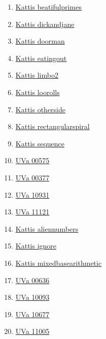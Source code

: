 \begin{enumerate}
\item \href{https://open.kattis.com/problems/beatifulprimes}{Kattis beatifulprimes}
\item \href{https://open.kattis.com/problems/dickandjane}{Kattis dickandjane}
\item \href{https://open.kattis.com/problems/doorman}{Kattis doorman}
\item \href{https://open.kattis.com/problems/eatingout}{Kattis eatingout}
\item \href{https://open.kattis.com/problems/limbo2}{Kattis limbo2}
\item \href{https://open.kattis.com/problems/loorolls}{Kattis loorolls}
\item \href{https://open.kattis.com/problems/otherside}{Kattis otherside}
\item \href{https://open.kattis.com/problems/rectangularspiral}{Kattis rectangularspiral}
\item \href{https://open.kattis.com/problems/sequence}{Kattis sequence}
\item \href{https://onlinejudge.org/index.php?option=com_onlinejudge&Itemid=8&page=show_problem&problem=516}{UVa 00575}
\item \href{https://onlinejudge.org/index.php?option=com_onlinejudge&Itemid=8&page=show_problem&problem=313}{UVa 00377}
\item \href{https://onlinejudge.org/index.php?option=com_onlinejudge&Itemid=8&page=show_problem&problem=1872}{UVa 10931}
\item \href{https://onlinejudge.org/index.php?option=com_onlinejudge&Itemid=8&page=show_problem&problem=2062}{UVa 11121}
\item \href{https://open.kattis.com/problems/aliennumbers}{Kattis aliennumbers}
\item \href{https://open.kattis.com/problems/ignore}{Kattis ignore}
\item \href{https://open.kattis.com/problems/mixedbasearithmetic}{Kattis mixedbasearithmetic}
\item \href{https://onlinejudge.org/index.php?option=com_onlinejudge&Itemid=8&page=show_problem&problem=577}{UVa 00636}
\item \href{https://onlinejudge.org/index.php?option=com_onlinejudge&Itemid=8&page=show_problem&problem=1034}{UVa 10093}
\item \href{https://onlinejudge.org/index.php?option=com_onlinejudge&Itemid=8&page=show_problem&problem=1618}{UVa 10677}
\item \href{https://onlinejudge.org/index.php?option=com_onlinejudge&Itemid=8&page=show_problem&problem=1946}{UVa 11005}

\end{enumerate}
